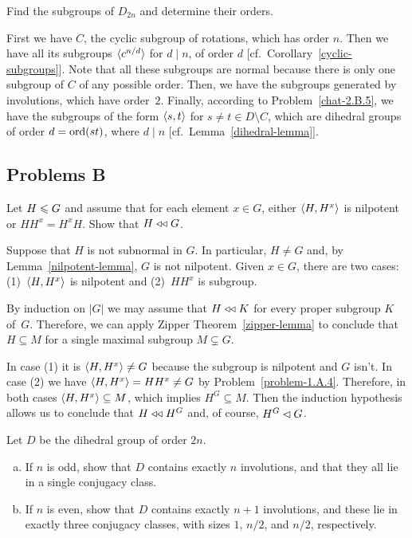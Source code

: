 \begin{probl}
    Find the subgroups of $D_{2n}$ and determine their orders.
\end{probl}

\begin{solution} First we have $C$, the cyclic subgroup of rotations, which has order $n$. Then we have all its subgroups $\langle c^{n/d}\rangle$ for $d\mid n$, of order $d$ [cf.~Corollary~\ref{cyclic-subgroups}]. Note that all these subgroups are normal because there is only one subgroup of $C$ of any possible order. Then, we have the subgroups generated by involutions, which have order~$2$. Finally, according to Problem~\ref{chat-2.B.5}, we have the subgroups of the form $\langle s,t\rangle$ for $s\ne t\in D\setminus C$, which are dihedral groups of order $d={\rm ord}(st)$, where $d\mid n$ [cf.~Lemma~\ref{dihedral-lemma}].  \end{solution}


\subsection{Problems B}

\begin{probl}
    Let\/ $H\leqslant G$ and assume that for each element\/ $x\in G$, either\/ $\langle H, H^x\rangle$ is nilpotent or\/ $HH^x=H^xH$. Show that\/ $H\mathrel{\triangleleft\triangleleft} G$.
\end{probl}

\begin{solution} Suppose that $H$ is not subnormal in $G$. In particular, $H\ne G$ and, by Lemma~\ref{nilpotent-lemma}, $G$ is not nilpotent. Given $x\in G$, there are two cases: (1)~$\langle H,H^x\rangle$ is nilpotent and (2)~$HH^x$ is subgroup.

By induction on $|G|$ we may assume that $H\mathrel{\triangleleft\triangleleft} K$ for every proper subgroup $K$ of~$G$. Therefore, we can apply Zipper Theorem~\ref{zipper-lemma} to conclude that $H\subseteq M$ for a single maximal subgroup $M\varsubsetneq G$. 

In case (1) it is $\langle H,H^x\rangle\ne G$ because the subgroup is nilpotent and $G$ isn't. In case (2) we have $\langle H,H^x\rangle=HH^x\ne G$ by Problem~\ref{problem-1.A.4}. Therefore, in both cases $\langle H,H^x\rangle\subseteq M$, which implies $H^G\subseteq M$. Then the induction hypothesis allows us to conclude that $H\mathrel{\triangleleft\triangleleft} H^G$ and, of course, $H^G\lhd G$.  \end{solution}

\begin{probl}\label{problem-2.B.2}
    Let\/ $D$ be the dihedral group of order\/ $2n$.
    \begin{enumerate}[a),font=\upshape]
    \item If\/ $n$ is odd, show that\/ $D$ contains exactly\/ $n$ involutions, and that they all lie in a single conjugacy class.
    \item If\/ $n$ is even, show that\/ $D$ contains exactly\/ $n + 1$ involutions, and these lie in exactly three conjugacy classes, with sizes\/ $1$, $n/2$, and\/ $n/2$, respectively.
    \end{enumerate}
\end{probl}

